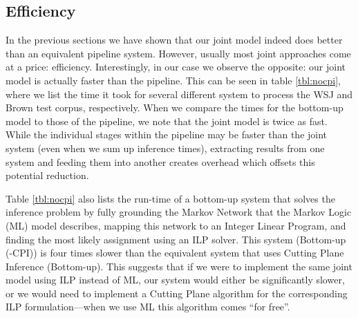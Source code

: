 \subsection{Efficiency}
In the previous sections we have shown that our joint model indeed does better than an equivalent pipeline system. However, usually most joint approaches come at a price: efficiency. Interestingly, in our case we observe the opposite: our joint model is actually faster than the pipeline. This can be seen in table \ref{tbl:nocpi}, where we list the time it took for several different system to process the WSJ and Brown test corpus, respectively. When we compare the times for the bottom-up model to those of the pipeline, we note that the joint model is twice as fast. While the individual stages within the pipeline may be faster than the joint system (even when we sum up inference times), extracting results from one system and feeding them into another creates overhead which offsets this potential reduction.  

Table \ref{tbl:nocpi} also lists the run-time of a bottom-up system that solves the inference problem by fully grounding the Markov Network that the Markov Logic (ML) model describes, mapping this network to an Integer Linear Program, and finding the most likely assignment using an ILP solver. This system (Bottom-up (-CPI)) is four times slower than the equivalent system that uses Cutting Plane Inference  (Bottom-up). This suggests that if we were to implement the same joint model using ILP instead of ML, our system would either be significantly slower, or we would need to implement a Cutting Plane algorithm for the corresponding ILP formulation---when we use ML this algorithm comes ``for free''. 


